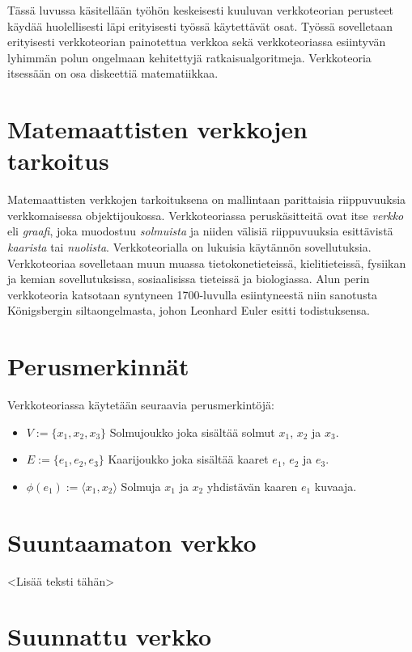 Tässä luvussa käsitellään työhön keskeisesti kuuluvan verkkoteorian perusteet käydää huolellisesti läpi erityisesti työssä käytettävät osat.
Työssä sovelletaan erityisesti verkkoteorian painotettua verkkoa sekä verkkoteoriassa esiintyvän lyhimmän polun ongelmaan kehitettyjä ratkaisualgoritmeja.
Verkkoteoria itsessään on osa diskeettiä matematiikkaa.

\section{Matemaattisten verkkojen tarkoitus}

Matemaattisten verkkojen tarkoituksena on mallintaan parittaisia riippuvuuksia verkkomaisessa objektijoukossa.
Verkkoteoriassa peruskäsitteitä ovat itse \textit{verkko} eli \textit{graafi}, joka muodostuu \textit{solmuista} ja niiden välisiä riippuvuuksia esittävistä \textit{kaarista} tai \textit{nuolista}.
Verkkoteorialla on lukuisia käytännön sovellutuksia. Verkkoteoriaa sovelletaan muun muassa tietokonetieteissä, kielitieteissä, fysiikan ja kemian sovellutuksissa, sosiaalisissa tieteissä ja biologiassa.
Alun perin verkkoteoria katsotaan syntyneen 1700-luvulla esiintyneestä niin sanotusta Königsbergin siltaongelmasta, johon Leonhard Euler esitti todistuksensa.

\section{Perusmerkinnät}

Verkkoteoriassa käytetään seuraavia perusmerkintöjä:
\begin{itemize}
  \item \(V := \{x_1, x_2, x_3\}\) Solmujoukko joka sisältää solmut \(x_1\), \(x_2\) ja \(x_3\).
  \item \(E := \{e_1, e_2, e_3\}\) Kaarijoukko joka sisältää kaaret \(e_1\), \(e_2\) ja \(e_3\).
  \item \(\phi(e_1) := \langle x_1, x_2 \rangle\) Solmuja \(x_1\) ja \(x_2\) yhdistävän kaaren \(e_1\) kuvaaja.
\end{itemize}

\section{Suuntaamaton verkko}

<Lisää teksti tähän>

\section{Suunnattu verkko}

